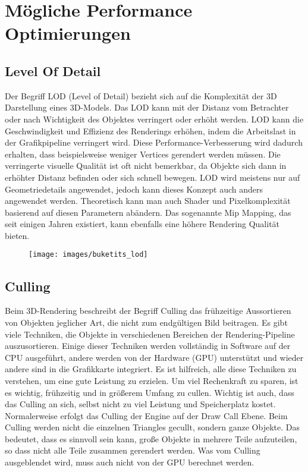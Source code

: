 \chapter{Mögliche Performance Optimierungen} \label{simon_performance}
\section{Level Of Detail}
Der Begriff LOD (Level of Detail) bezieht sich auf die Komplexität der 3D Darstellung eines 3D-Models. Das LOD kann mit der Distanz vom Betrachter oder nach Wichtigkeit des Objektes verringert oder erhöht werden. LOD kann die Geschwindigkeit und Effizienz des Renderings erhöhen, indem die Arbeitslast in der Grafikpipeline verringert wird. Diese Performance-Verbesserung wird dadurch erhalten, dass beispielsweise weniger Vertices gerendert werden müssen. Die verringerte visuelle Qualität ist oft nicht bemerkbar, da Objekte sich dann in erhöhter Distanz befinden oder sich schnell bewegen. LOD wird meistens nur auf Geometriedetails angewendet, jedoch kann dieses Konzept auch anders angewendet werden. Theoretisch kann man auch Shader und Pixelkomplexität basierend auf diesen Parametern abändern. Das sogenannte Mip Mapping, das seit einigen Jahren existiert, kann ebenfalls eine höhere Rendering Qualität bieten.

\begin{figure}[H]
	\centering
	\texttt{[image: images/buketits\_lod]}
	\caption{\cite{_lod_formeshes}}
\end{figure}


\section{Culling}
Beim 3D-Rendering beschreibt der Begriff Culling das frühzeitige Aussortieren von Objekten jeglicher Art, die nicht zum endgültigen Bild beitragen. Es gibt viele Techniken, die Objekte in verschiedenen Bereichen der Rendering-Pipeline auszusortieren. Einige dieser Techniken werden vollständig in Software auf der CPU ausgeführt, andere werden von der Hardware (GPU) unterstützt und wieder andere sind in die Grafikkarte integriert. Es ist hilfreich, alle diese Techniken zu verstehen, um eine gute Leistung zu erzielen. Um viel Rechenkraft zu sparen, ist es wichtig, frühzeitig und in größerem Umfang zu cullen. Wichtig ist auch, dass das Culling an sich, selbst nicht zu viel Leistung und Speicherplatz kostet.
Normalerweise erfolgt das Culling der Engine auf der Draw Call Ebene. Beim Culling werden nicht die einzelnen Triangles gecullt, sondern ganze Objekte. Das bedeutet, dass es sinnvoll sein kann, große Objekte in mehrere Teile aufzuteilen, so dass nicht alle Teile zusammen gerendert werden.
Was vom Culling ausgeblendet wird, muss auch nicht von der GPU berechnet werden.

